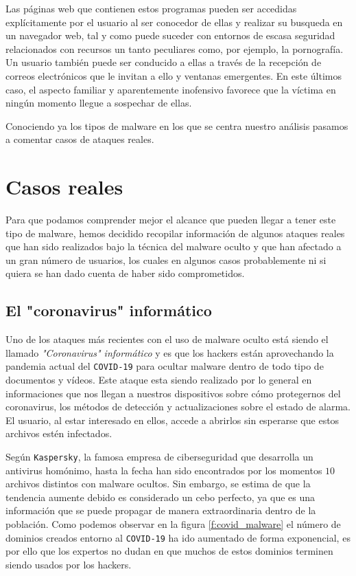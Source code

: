 \documentclass[12pt]{article}
\newcommand{\newpar} {
    \vskip 1cm
}
\begin{document}
            \newpar

            Las páginas web que contienen estos programas pueden ser accedidas explícitamente por el usuario al ser conocedor de ellas y realizar su busqueda en un navegador web, tal y como puede suceder con entornos de escasa seguridad relacionados con recursos un tanto peculiares como, por ejemplo, la pornografía. Un usuario también puede ser conducido a ellas a través de la recepción de correos electrónicos que le invitan a ello y ventanas emergentes. En este últimos caso, el aspecto familiar y aparentemente inofensivo favorece que la víctima en ningún momento llegue a sospechar de ellas.

            \newpar

            Conociendo ya los tipos de malware en los que se centra nuestro análisis pasamos a comentar casos de ataques reales.

    \section{Casos reales}
        Para que podamos comprender mejor el alcance que pueden llegar a tener este tipo de malware, hemos decidido recopilar información de algunos ataques reales que han sido realizados bajo la técnica del malware oculto y que han afectado a un gran número de usuarios, los cuales en algunos casos probablemente ni si quiera se han dado cuenta de haber sido comprometidos.

        \subsection{El "coronavirus" informático}
            Uno de los ataques más recientes con el uso de malware oculto está siendo el llamado \textit{"Coronavirus" informático} y es que los hackers están aprovechando la pandemia actual del \texttt{COVID-19} para ocultar malware dentro de todo tipo de documentos y vídeos. Este ataque esta siendo realizado por lo general en informaciones que nos llegan a nuestros dispositivos sobre cómo protegernos del coronavirus, los métodos de detección y actualizaciones sobre el estado de alarma. El usuario, al estar interesado en ellos, accede a abrirlos sin esperarse que estos archivos estén infectados.

            \newpar

            Según \texttt{Kaspersky}, la famosa empresa de ciberseguridad que desarrolla un antivirus homónimo, hasta la fecha han sido encontrados por los momentos $10$ archivos distintos con malware ocultos. Sin embargo, se estima de que la tendencia aumente debido es considerado un cebo perfecto, ya que es una información que se puede propagar de manera extraordinaria dentro de la población. Como podemos observar en la figura \ref{f:covid_malware} el número de dominios creados entorno al \texttt{COVID-19} ha ido aumentado de forma exponencial, es por ello que los expertos no dudan en que muchos de estos dominios terminen siendo usados por los hackers.
\end{document}
